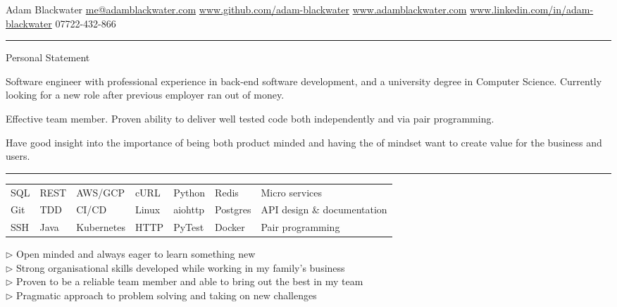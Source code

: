 \documentclass[12pt,twoside]{article}
\begin{document}
\topheading
    {Adam Blackwater}
    {\url{me@adamblackwater.com} \hspace{0.15em}}
    {\url{www.github.com/adam-blackwater}}
    {\url{www.adamblackwater.com}}
    {\url{www.linkedin.com/in/adam-blackwater}}
    {07722-432-866}
    

\vspace{0.5em}
\hrule
\vspace{0.5em}

\statement
    {Personal Statement}
    {
        Software engineer with professional experience in back-end software
        development, and a university degree in Computer Science. Currently
        looking for a new role after previous employer ran out of money.

        \hspace{1.5em}Effective team member. Proven ability to deliver well
        tested code both independently and via pair programming. 

        \hspace{1.5em}Have good insight into the importance of being both
        product minded and having the of mindset want to create value for the
        business and users.
    }

\vspace{0.5em}
\hrule
\vspace{0.5em}

\begin{center}
    \begin{tabular}{l l l l l l l}
        SQL & REST & AWS/GCP & cURL & Python & Redis & Micro services \\
        Git & TDD & CI/CD & Linux & aiohttp & Postgres & API design \& documentation \\
        SSH & Java & Kubernetes & HTTP & PyTest& Docker & Pair programming
    \end{tabular}
\end{center}
    
\parbox{35em}{
        $\triangleright$ Open minded and always eager to learn something new \\
        $\triangleright$ Strong organisational skills developed while working in my family's business \\
        $\triangleright$ Proven to be a reliable team member and able to bring out the best in my team \\
        $\triangleright$ Pragmatic approach to problem solving and taking on new challenges 
    }
\end{document}

